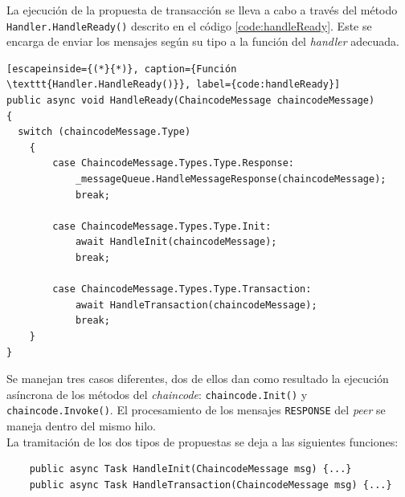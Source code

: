 


La ejecución de la propuesta de transacción se lleva a cabo a través del método \texttt{Handler.HandleReady()} descrito en el código \ref{code:handleReady}. Este se encarga de enviar los mensajes según su tipo a la función del \textit{handler} adecuada.\\


\begin{lstlisting}[escapeinside={(*}{*)}, caption={Función \texttt{Handler.HandleReady()}}, label={code:handleReady}]
public async void HandleReady(ChaincodeMessage chaincodeMessage)  
{
  switch (chaincodeMessage.Type)
    {
	    case ChaincodeMessage.Types.Type.Response:
	        _messageQueue.HandleMessageResponse(chaincodeMessage);
	        break;
	
	    case ChaincodeMessage.Types.Type.Init:
	        await HandleInit(chaincodeMessage);
	        break;
	
	    case ChaincodeMessage.Types.Type.Transaction:
	        await HandleTransaction(chaincodeMessage);
	        break;
    }
}
\end{lstlisting}

Se manejan tres casos diferentes, dos de ellos dan como resultado la ejecución asíncrona de los métodos del \textit{chaincode}: \texttt{chaincode.Init()} y \texttt{chaincode.Invoke()}. El procesamiento de los mensajes \texttt{RESPONSE} del \textit{peer} se maneja dentro del mismo hilo.\\

La tramitación de los dos tipos de propuestas se deja a las siguientes funciones:\\

\begin{lstlisting}
	public async Task HandleInit(ChaincodeMessage msg) {...}
	public async Task HandleTransaction(ChaincodeMessage msg) {...}
\end{lstlisting}

